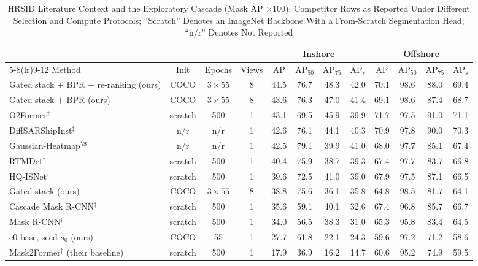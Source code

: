 \begin{table}[!t]
\caption{HRSID Literature Context and the Exploratory Cascade (Mask AP $\times$100). Competitor Rows as Reported Under Different Selection and Compute Protocols; ``Scratch'' Denotes an ImageNet Backbone With a From-Scratch Segmentation Head; ``n/r'' Denotes Not Reported}
\label{tab:sota}
\centering
\footnotesize
\setlength{\tabcolsep}{4pt}
\begin{tabular}{lccccccccccc}
\toprule
& & & & \multicolumn{4}{c}{Inshore} & \multicolumn{4}{c}{Offshore} \\
\cmidrule(lr){5-8}\cmidrule(lr){9-12}
Method & Init & Epochs & Views & AP & AP$_{50}$ & AP$_{75}$ & AP$_s$ & AP & AP$_{50}$ & AP$_{75}$ & AP$_s$ \\
\midrule
Gated stack $+$ BPR $+$ re-ranking (ours) & COCO & $3\times55$ & 8 & 44.5 & 76.7 & 48.3 & 42.0 & 70.1 & 98.6 & 88.0 & 69.4 \\
Gated stack $+$ BPR (ours) & COCO & $3\times55$ & 8 & 43.6 & 76.3 & 47.0 & 41.4 & 69.1 & 98.6 & 87.4 & 68.7 \\
O2Former$^{\dagger}$ \cite{o2former2025} & scratch & 500 & 1 & 43.1 & 69.5 & 45.9 & 39.9 & 71.7 & 97.5 & 91.0 & 71.1 \\
DiffSARShipInst$^{\ddagger}$ \cite{diffsar2025} & n/r & n/r & 1 & 42.6 & 76.1 & 44.1 & 40.3 & 70.9 & 97.8 & 90.0 & 70.3 \\
Gaussian-Heatmap$^{\S}$ \cite{gaussheatmap2024} & n/r & n/r & 1 & 42.5 & 79.1 & 39.9 & 41.0 & 68.0 & 97.7 & 85.1 & 67.4 \\
RTMDet$^{\dagger}$ \cite{rtmdet2022} & scratch & 500 & 1 & 40.4 & 75.9 & 38.7 & 39.3 & 67.4 & 97.7 & 83.7 & 66.8 \\
HQ-ISNet$^{\dagger}$ \cite{hqisnet2020} & scratch & 500 & 1 & 39.6 & 72.5 & 41.0 & 39.0 & 67.9 & 97.5 & 87.1 & 66.5 \\
Gated stack (ours) & COCO & $3\times55$ & 8 & 38.8 & 75.6 & 36.1 & 35.8 & 64.8 & 98.5 & 81.7 & 64.1 \\
Cascade Mask R-CNN$^{\dagger}$ \cite{cascadercnn2021} & scratch & 500 & 1 & 35.6 & 59.1 & 40.1 & 32.6 & 67.4 & 96.8 & 85.7 & 66.7 \\
Mask R-CNN$^{\dagger}$ \cite{maskrcnn2017} & scratch & 500 & 1 & 34.0 & 56.5 & 38.3 & 31.0 & 65.3 & 95.8 & 83.4 & 64.5 \\
c0 base, seed $s_0$ (ours) & COCO & 55 & 1 & 27.7 & 61.8 & 22.1 & 24.3 & 59.6 & 97.2 & 71.2 & 58.6 \\
Mask2Former$^{\dagger}$ \cite{mask2former2022} (their baseline) & scratch & 500 & 1 & 17.9 & 36.9 & 16.2 & 14.7 & 60.6 & 95.2 & 74.9 & 59.5 \\

\end{tabular}
\end{table}
